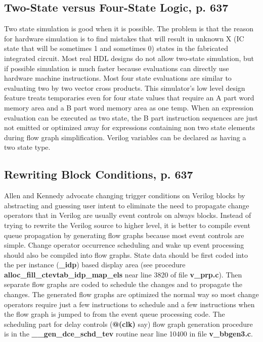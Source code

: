 \documentclass[preprint, authoryear]{sigplanconf}
\begin{document}
\subsection{Two-State versus Four-State Logic, p. 637}
\par
Two state simulation is good when it is possible.  The problem is that
the reason for hardware simulation is to find mistakes that will result
in unknown X (IC state that will be sometimes 1 and sometimes 0)
states in the fabricated integrated circuit.
Most real HDL designs do not allow two-state simulation, but if possible
simulation is much faster because evaluations can directly use
hardware machine instructions.
Most four state evaluations are similar to evaluating two by two vector
cross products.
This simulator's low level design feature treats temporaries even for
four state values that require an A part word memory area and a B part
word memory area as one temp.  When an expression evaluation
can be executed as two state, the B part instruction sequences are just
not emitted or optimized away for expressions containing non two state
elements during flow graph simplification.
Verilog variables can be declared as having a two state type.
\subsection{Rewriting Block Conditions, p. 637}
\par
Allen and Kennedy advocate changing trigger conditions on Verilog
blocks by abstracting and guessing user intent to 
eliminate the need to propagate change operators that in Verilog
are usually event controls on always blocks. Instead of trying
to rewrite the Verilog source to higher level, it is better to
compile event queue propagation by generating flow graphs because most
event controls are simple.
Change operator occurrence scheduling and wake up event processing
should also be compiled into flow graphs.
State data should be first coded into the per instance (\textbf{_idp})
based display area (see procedure
\textbf{alloc_fill_ctevtab_idp_map_els} near
line 3820 of file \textbf{v_prp.c}).  Then separate flow graphs are
coded to schedule the
changes and to propagate the changes.
The generated flow graphs are optimized
the normal way so most change operators require just a few instructions
to schedule and a few instructions when the flow graph is jumped to from
the event queue processing code.  The scheduling part for delay controls
(\textbf{@(clk)} say) flow graph generation procedure
is in the \textbf{__gen_dce_schd_tev} routine near line 10400 in file \textbf{v_bbgen3.c}.
\end{document}
